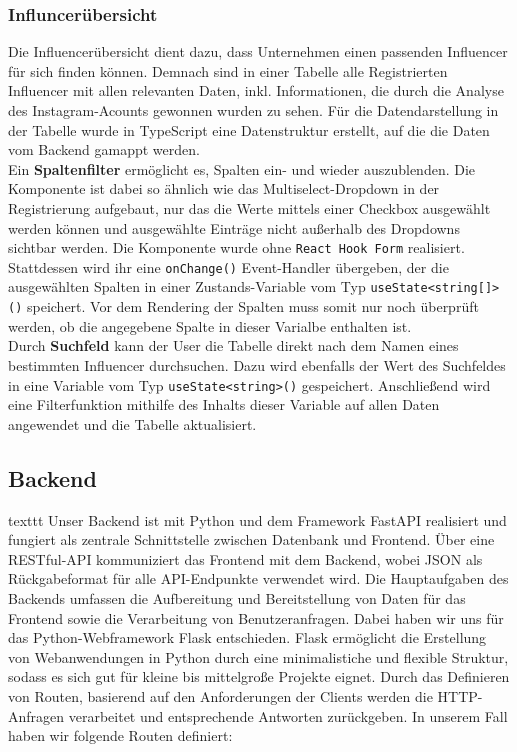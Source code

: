 \documentclass[conference,a4paper,flushend]{cs-techrep}
\begin{document}
\subsubsection{Influncerübersicht\\}
Die Influencerübersicht dient dazu, dass Unternehmen einen passenden Influencer für sich finden können. Demnach sind in einer Tabelle alle Registrierten Influencer mit allen relevanten Daten, inkl. Informationen, die durch die Analyse des Instagram-Acounts gewonnen wurden zu sehen. %
Für die Datendarstellung in der Tabelle wurde in TypeScript eine Datenstruktur erstellt, auf die die Daten vom Backend gamappt werden. %
\\
Ein \textbf{Spaltenfilter} ermöglicht es, Spalten ein- und wieder auszublenden. Die Komponente ist dabei so ähnlich wie das Multiselect-Dropdown in der Registrierung aufgebaut, nur das die Werte mittels einer Checkbox ausgewählt werden können und ausgewählte Einträge nicht außerhalb des Dropdowns sichtbar werden. Die Komponente wurde ohne \texttt{React Hook Form} realisiert. Stattdessen wird ihr eine \texttt{onChange()} Event-Handler übergeben, der die ausgewählten Spalten in einer Zustands-Variable vom Typ \texttt{useState<string[]>()} speichert. Vor dem Rendering der Spalten muss somit nur noch überprüft werden, ob die angegebene Spalte in dieser Varialbe enthalten ist. 
\\
Durch \textbf{Suchfeld} kann der User die Tabelle direkt nach dem Namen eines bestimmten Influencer durchsuchen. Dazu wird ebenfalls der Wert des Suchfeldes in eine Variable vom Typ \texttt{useState<string>()} gespeichert. Anschließend wird eine Filterfunktion mithilfe des Inhalts dieser Variable auf allen Daten angewendet und die Tabelle aktualisiert.


\subsection{Backend}
texttt{
Unser Backend ist mit Python und dem Framework FastAPI realisiert und fungiert als zentrale Schnittstelle zwischen Datenbank und Frontend. Über eine RESTful-API kommuniziert das Frontend mit dem Backend, wobei JSON als Rückgabeformat für alle API-Endpunkte verwendet wird.
}
Die Hauptaufgaben des Backends umfassen die Aufbereitung und Bereitstellung von Daten für das Frontend sowie die Verarbeitung von Benutzeranfragen. Dabei haben wir uns für das Python-Webframework Flask entschieden. Flask ermöglicht die Erstellung von Webanwendungen in Python durch eine minimalistiche und flexible Struktur, sodass es sich gut für kleine bis mittelgroße Projekte eignet. Durch das Definieren von Routen, basierend auf den Anforderungen der Clients werden die HTTP-Anfragen verarbeitet und entsprechende Antworten zurückgeben. In unserem Fall haben wir folgende Routen definiert:
\end{document}
